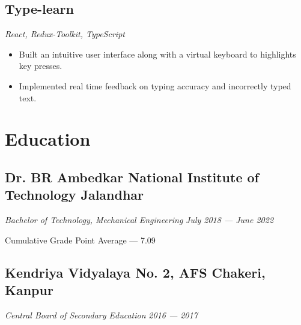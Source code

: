 \documentclass[a4paper]{article}
\begin{document}
\subsection{Type-learn}
\textit{React, Redux-Toolkit, TypeScript}
\hfill
\href{https://type-learn.netlify.app/}{ \faLink }
\textbar
\href{https://github.com/jatinkumar-me/type-learn}{ \faCode}
\begin{itemize}
    \item Built an intuitive user interface along with a virtual keyboard to highlights key presses.
    \item Implemented real time feedback on typing accuracy and incorrectly typed text.
\end{itemize}



\section{Education}
\subsection{Dr. BR Ambedkar National Institute of Technology Jalandhar}
\textit{Bachelor of Technology, Mechanical Engineering}
\hfill
\textit{July 2018 --- June 2022}

Cumulative Grade Point Average --- 7.09

\subsection{Kendriya Vidyalaya No. 2, AFS Chakeri, Kanpur}
\textit{Central Board of Secondary Education}
\hfill
\textit{2016 --- 2017}
\end{document}
